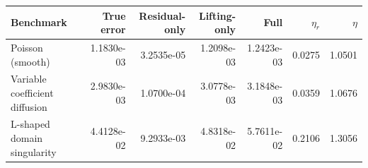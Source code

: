 \begin{tabular}{lrrrrrr}
\toprule
Benchmark & True error & Residual-only & Lifting-only & Full & $\eta_r$ & $\eta$ \\
\midrule
Poisson (smooth) & 1.1830e-03 & 3.2535e-05 & 1.2098e-03 & 1.2423e-03 & 0.0275 & 1.0501 \\
Variable coefficient diffusion & 2.9830e-03 & 1.0700e-04 & 3.0778e-03 & 3.1848e-03 & 0.0359 & 1.0676 \\
L-shaped domain singularity & 4.4128e-02 & 9.2933e-03 & 4.8318e-02 & 5.7611e-02 & 0.2106 & 1.3056 \\
\bottomrule
\end{tabular}
